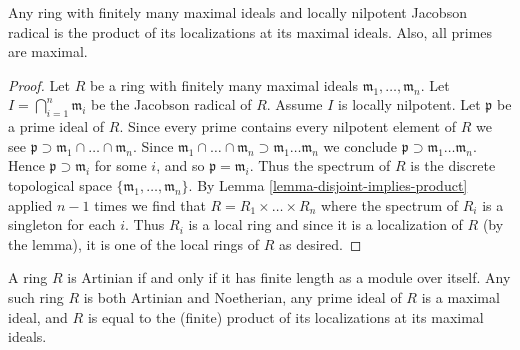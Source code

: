 \begin{lemma}
\label{lemma-product-local}
Any ring with finitely many maximal ideals and
locally nilpotent Jacobson radical is the product of its localizations
at its maximal ideals. Also, all primes are maximal.
\end{lemma}

\begin{proof}
Let $R$ be a ring with finitely many maximal ideals
$\mathfrak m_1, \ldots, \mathfrak m_n$.
Let $I = \bigcap_{i = 1}^n \mathfrak m_i$
be the Jacobson radical of $R$. Assume $I$ is locally nilpotent.
Let $\mathfrak p$ be a prime ideal of $R$.
Since every prime contains every nilpotent
element of $R$ we see
$ \mathfrak p \supset \mathfrak m_1 \cap \ldots \cap \mathfrak m_n$.
Since $\mathfrak m_1 \cap \ldots \cap \mathfrak m_n \supset
\mathfrak m_1 \ldots \mathfrak m_n$
we conclude $\mathfrak p \supset \mathfrak m_1 \ldots \mathfrak m_n$.
Hence $\mathfrak p \supset \mathfrak m_i$ for some $i$, and so
$\mathfrak p = \mathfrak m_i$. Thus the spectrum of $R$
is the discrete topological space $\{\mathfrak m_1, \ldots, \mathfrak m_n\}$.
By Lemma \ref{lemma-disjoint-implies-product} applied $n - 1$ times
we find that $R = R_1 \times \ldots \times R_n$ where the
spectrum of $R_i$ is a singleton for each $i$.
Thus $R_i$ is a local ring and since it is a localization of $R$
(by the lemma), it is one of the local rings of $R$ as desired.
\end{proof}

\begin{lemma}
\label{lemma-artinian-finite-length}
A ring $R$ is Artinian if and only if it has finite length
as a module over itself. Any such ring $R$ is both Artinian and
Noetherian, any prime ideal of $R$ is a maximal ideal, and $R$ is equal
to the (finite) product of its localizations at its maximal ideals.
\end{lemma}


